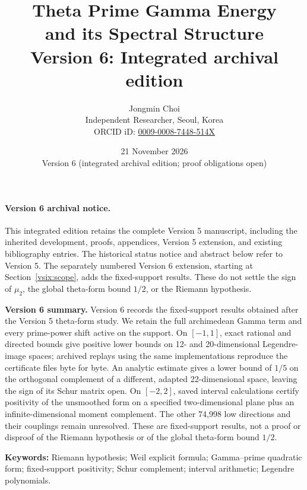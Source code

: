 \documentclass[11pt,a4paper]{article}
\title{Theta Prime Gamma Energy\\and its Spectral Structure\\{\large Version 6: Integrated archival edition}}
\author{Jongmin Choi\\[3pt]\small Independent Researcher, Seoul, Korea\\\small ORCID iD: \href{https://orcid.org/0009-0008-7448-514X}{0009-0008-7448-514X}}
\date{21 November 2026\\Version 6 (integrated archival edition; proof obligations open)}
\numberwithin{equation}{section}
\theoremstyle{definition}\newtheorem{definition}[theorem]{Definition}
\theoremstyle{remark}\newtheorem{remark}[theorem]{Remark}
\begin{document}
\maketitle

\paragraph{Version 6 archival notice.}
This integrated edition retains the complete Version 5 manuscript, including the
inherited development, proofs, appendices, Version 5 extension, and existing
bibliography entries. The historical status notice and abstract below refer to
Version 5. The separately numbered Version 6 extension, starting at
Section~\ref{vsix:scope}, adds the fixed-support results. These do not settle the
sign of $\mu_2$, the global theta-form bound $1/2$, or the Riemann hypothesis.
\par\medskip\noindent\textbf{Version 6 summary.} Version 6 records the fixed-support results obtained after the Version 5 theta-form study. We retain the full archimedean Gamma term and every prime-power shift active on the support. On $[-1,1]$, exact rational and directed bounds give positive lower bounds on 12- and 20-dimensional Legendre-image spaces; archived replays using the same implementations reproduce the certificate files byte for byte. An analytic estimate gives a lower bound of $1/5$ on the orthogonal complement of a different, adapted 22-dimensional space, leaving the sign of its Schur matrix open. On $[-2,2]$, saved interval calculations certify positivity of the unsmoothed form on a specified two-dimensional plane plus an infinite-dimensional moment complement. The other 74,998 low directions and their couplings remain unresolved. These are fixed-support results, not a proof or disproof of the Riemann hypothesis or of the global theta-form bound $1/2$.

\noindent\textbf{Keywords:} Riemann hypothesis; Weil explicit formula; Gamma--prime quadratic form; fixed-support positivity; Schur complement; interval arithmetic; Legendre polynomials.
\end{document}
